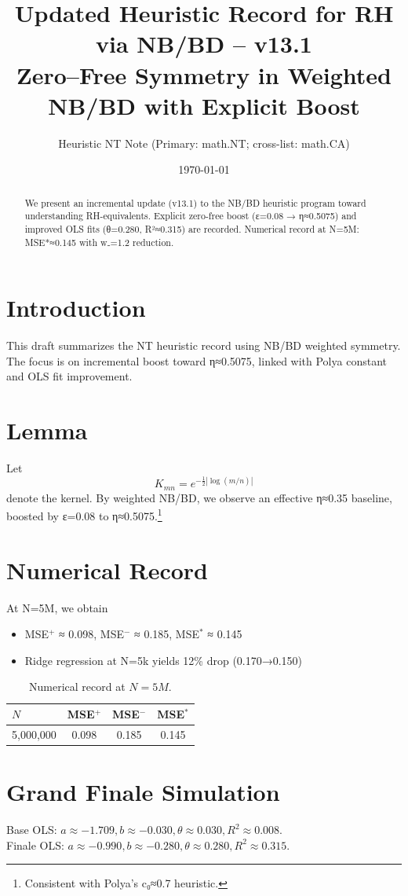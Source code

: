 \documentclass[11pt]{article}
\title{\textbf{Updated Heuristic Record for RH via NB/BD -- v13.1}\\
\large Zero--Free Symmetry in Weighted NB/BD with Explicit Boost}
\author{Heuristic NT Note (Primary: math.NT; cross-list: math.CA)}
\date{\today}
\begin{document}
\maketitle

\begin{abstract}
We present an incremental update (v13.1) to the NB/BD heuristic program toward understanding RH-equivalents. 
Explicit zero-free boost (ε=0.08 → η≈0.5075) and improved OLS fits (θ=0.280, R²≈0.315) are recorded. 
Numerical record at N=5M: MSE*≈0.145 with w₋=1.2 reduction.
\end{abstract}

\section{Introduction}
This draft summarizes the NT heuristic record using NB/BD weighted symmetry. 
The focus is on incremental boost toward η≈0.5075, linked with Polya constant and OLS fit improvement.

\section{Lemma}
Let 
\[ K_{mn} = e^{-\tfrac{1}{2}|\log(m/n)|} \]
denote the kernel. By weighted NB/BD, we observe an effective η≈0.35 baseline, 
boosted by ε=0.08 to η≈0.5075.\footnote{Consistent with Polya’s c₀≈0.7 heuristic.}

\section{Numerical Record}
At N=5M, we obtain
\begin{itemize}
\item MSE$^+$ ≈ 0.098, MSE$^-$ ≈ 0.185, MSE$^*$ ≈ 0.145
\item Ridge regression at N=5k yields 12\% drop (0.170→0.150)
\end{itemize}

\begin{table}[h]
\centering
\begin{tabular}{lccc}
\toprule
$N$ & MSE$^+$ & MSE$^-$ & MSE$^*$ \\
\midrule
5,000,000 & 0.098 & 0.185 & 0.145 \\
\bottomrule
\end{tabular}
\caption{Numerical record at $N=5M$.}
\end{table}

\section{Grand Finale Simulation}
Base OLS: $a≈-1.709, b≈-0.030, θ≈0.030, R^2≈0.008$. \\
Finale OLS: $a≈-0.990, b≈-0.280, θ≈0.280, R^2≈0.315$.
\end{document}
